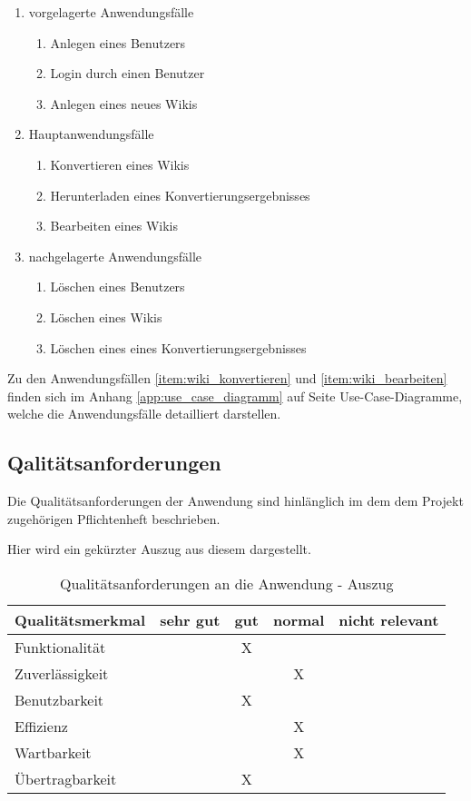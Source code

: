 \documentclass[12pt, xcolor=dvipsnames]{scrartcl}
\begin{document}
\begin{enumerate}
	\item vorgelagerte Anwendungsfälle
	\begin{enumerate}
		\item Anlegen eines Benutzers		
		\item Login durch einen Benutzer
		\item Anlegen eines neues Wikis	
	\end{enumerate}
	\item Hauptanwendungsfälle
	\begin{enumerate}
		\item Konvertieren eines Wikis \label{item:wiki_konvertieren}
		\item Herunterladen eines Konvertierungsergebnisses
		\item Bearbeiten eines Wikis \label{item:wiki_bearbeiten}
	\end{enumerate}
	\item nachgelagerte Anwendungsfälle
	\begin{enumerate}
		\item Löschen eines Benutzers
		\item Löschen eines Wikis
		\item Löschen eines eines Konvertierungsergebnisses
	\end{enumerate}
\end{enumerate}

Zu den Anwendungsfällen \ref{item:wiki_konvertieren} und \ref{item:wiki_bearbeiten} finden sich im Anhang \ref{app:use_case_diagramm} auf Seite \pageref{app:use_case_diagramm} Use-Case-Diagramme, welche die Anwendungsfälle detailliert darstellen.


\subsection{Qalitätsanforderungen}

Die Qualitätsanforderungen der Anwendung sind hinlänglich im dem dem Projekt zugehörigen Pflichtenheft beschrieben.

Hier wird ein gekürzter Auszug aus diesem dargestellt.

\begin{table}[H]
	\centering
	\begin{tabular}{lcccc}
	
	\rowcolor{white!15}
		\textbf{Qualitätsmerkmal} & \textbf{sehr gut} & \textbf{gut} & \textbf{normal} 
		& \textbf{nicht relevant}\\\hline
		

		Funktionalität 		&	& X	&	&	\\
		Zuverlässigkeit 	&	&	& X	&	\\
		Benutzbarkeit 		&	& X	&	&	\\
		Effizienz	 		&	&	& X	&	\\
		Wartbarkeit 		&	&	& X	&	\\
		Übertragbarkeit 	&	& X	&	&	\\
	\end{tabular}	
	
	\caption{Qualitätsanforderungen an die Anwendung - Auszug}
	\label{tab:qualitätsanforderungen}
\end{table}
\end{document}

